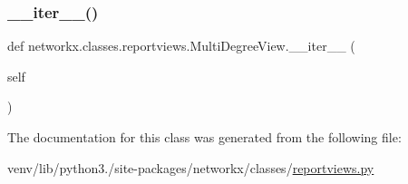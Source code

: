 \mbox{\label{classnetworkx_1_1classes_1_1reportviews_1_1MultiDegreeView_ae4c1187c6cc944ebef30b54716121565}} 
\subsubsection{\texorpdfstring{\+\_\+\+\_\+iter\+\_\+\+\_\+()}{\_\_iter\_\_()}}
{\footnotesize\ttfamily def networkx.\+classes.\+reportviews.\+Multi\+Degree\+View.\+\_\+\+\_\+iter\+\_\+\+\_\+ (\begin{DoxyParamCaption}\item[{}]{self }\end{DoxyParamCaption})}



The documentation for this class was generated from the following file\+:\begin{DoxyCompactItemize}
\item 
venv/lib/python3./site-\/packages/networkx/classes/\hyperlink{reportviews_8py}{reportviews.\+py}\end{DoxyCompactItemize}
